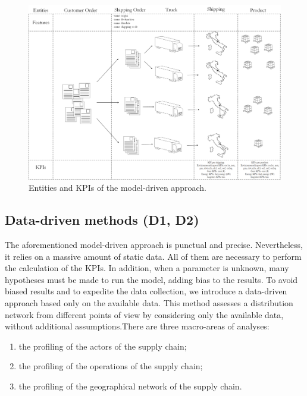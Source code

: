 \begin{figure}[hbt!]
\centering
\includegraphics[width=1.0\textwidth]{SectionDistribution/control_figures/fig_networkAnalyser.png}
\captionsetup{type=table}
\caption{Entities and KPIs of the model-driven approach.}
\label{fig_networkAnalyser}
\end{figure}

\subsection{Data-driven methods (D1, D2)}
The aforementioned model-driven approach is punctual and precise. Nevertheless, it relies on a massive amount of static data. All of them are necessary to perform the calculation of the KPIs. In addition, when a parameter is unknown, many hypotheses must be made to run the model, adding bias to the results. To avoid biased results and to expedite the data collection, we introduce a data-driven approach based only on the available data. This method assesses a distribution network from different points of view by considering only the available data, without additional assumptions.There are three macro-areas of analyses:
\begin{enumerate}
    \item the profiling of the actors of the supply chain;
	\item the profiling of the operations of the supply chain;
    \item the profiling of the geographical network of the supply chain.

\end{enumerate}

